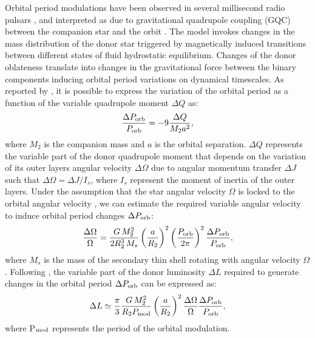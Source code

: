 \documentclass[fleqn,usenatbib]{mnras}
\begin{document}
Orbital period modulations have been observed in several millisecond radio pulsars \citep[e.g., PSR B1957$+$20, PSR J2051$-$0827, and PSR J2339$-$0533;][]{ Applegate:1994vp,Doroshenko2001a,Pletsch2015a}, and interpreted as due to gravitational quadrupole coupling (GQC) between the companion star and the orbit \citep{Applegate:1992uh, Applegate:1994vp}. The model invokes changes in the mass distribution of the donor star triggered by magnetically induced transitions between different states of fluid hydrostatic equilibrium. Changes of the donor oblateness translate into changes in the gravitational force between the binary components inducing orbital period variations on dynamical timescales. As reported by \citet{Applegate:1992uh}, it is possible to express the variation of the orbital period as a function of the variable quadrupole moment $\Delta Q$ as:
\begin{eqnarray}
\frac{\Delta P_{\rm orb}}{P_{\rm orb}}= -9\frac{\Delta Q}{M_2 a^2},
\label{eq:ap1}
\end{eqnarray}
where $M_2$ is the companion mass and $a$ is the orbital separation. 
$\Delta Q$ represents the variable part of the donor quadrupole moment that depends on the variation of its outer layers angular velocity $\Delta \Omega$ due to angular momentum transfer $\Delta J$ such that $\Delta \Omega=\Delta J /I_s$, where $I_s$ represent the moment of inertia of the outer layers. 
Under the assumption that the star angular velocity $\Omega$ is locked to the orbital angular velocity \citep{Applegate:1994vp}, we can estimate the required variable angular velocity to induce orbital period changes $\Delta P_{\rm orb}$:
\begin{eqnarray}
\frac{\Delta \Omega}{\Omega}= \frac{G\,M_2^2}{2R_2^3\,M_s} \left(\frac{a}{R_2}\right)^2\left(\frac{P_{\rm orb}}{2\pi}\right)^2 \frac{\Delta P_{\rm orb}}{P_{\rm orb}},
\label{eq:ap3}
\end{eqnarray}
where $M_s$ is the mass of the secondary thin shell rotating with angular velocity $\Omega$. Following \citet{Applegate:1992uh}, the variable part of the donor luminosity $\Delta L$ required to generate changes in the orbital period $\Delta P_{\rm orb}$ can be expressed as:
\begin{eqnarray}
\Delta L\simeq \frac{\pi}{3} \frac{G\,M_2^2}{R_2 P_{\rm mod}} \left(\frac{a}{R_2}\right)^2 \frac{\Delta \Omega}{\Omega} \frac{\Delta P_{\rm orb}}{P_{\rm orb}},
\label{eq:ap5}
\end{eqnarray}
where P$_{\rm mod}$ represents the period of the orbital modulation. 
\end{document}
